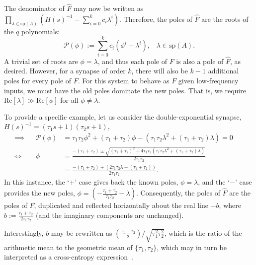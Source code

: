 The denominator of $\hat{F}$ may now be written as $\prod_{\lambda \in \text{sp}(A)} \left( H(s)^{-1} - \sum_{i=0}^k c_i \lambda^i \right)$.
Therefore, the poles of $\hat{F}$ are the roots of the $q$ polynomials:
\begin{equation*}
\mathcal{P}(\phi) := \sum_{i=0}^k c_i \left( \phi^i - \lambda^i \right) \text{,} \quad \lambda \in \text{sp}(A) \text{.}
\end{equation*}
A trivial set of roots are $\phi = \lambda$, and thus each pole of $F$ is also a pole of $\hat{F}$, as desired.
However, for a synapse of order $k$, there will also be $k - 1$ additional poles for every pole of $F$.
For this system to behave as $F$ given low-frequency inputs, we must have the old poles dominate the new poles.
That is, we require $\text{Re} \left[ \lambda \right] \gg \text{Re} \left[ \phi \right]$ for all $\phi \ne \lambda$.

To provide a specific example, let us consider the double-exponential synapse, $H(s)^{-1} = (\tau_1 s + 1)(\tau_2 s + 1)$,
\begin{align*}
\implies && \mathcal{P}(\phi) &= \tau_1 \tau_2 \phi^2 + (\tau_1 + \tau_2) \phi - (\tau_1 \tau_2 \lambda^2 + (\tau_1 + \tau_2) \lambda) = 0 && \\
\iff && \phi &= \frac{-(\tau_1 + \tau_2) \pm \sqrt{(\tau_1 + \tau_2)^2 + 4\tau_1 \tau_2 \left(\tau_1 \tau_2 \lambda^2 + (\tau_1 + \tau_2) \lambda \right)}}{2 \tau_1 \tau_2} && \\
&& &= \frac{-(\tau_1 + \tau_2) \pm \left(2 \tau_1 \tau_2 \lambda + (\tau_1 + \tau_2) \right)}{2 \tau_1 \tau_2} \text{.} &&
\end{align*}
In this instance, the `$+$' case gives back the known poles, $\phi = \lambda$, and the `$-$' case provides the new poles, $\phi = \left(- \frac{\tau_1 + \tau_2}{\tau_1 \tau_2} - \lambda \right)$.
Consequently, the poles of $\hat{F}$ are the poles of $F$, duplicated and reflected horizontally about the real line $- b$, where $b := \frac{\tau_1 + \tau_2}{2 \tau_1 \tau_2}$ (and the imaginary components are unchanged).

Interestingly, $b$ may be rewritten as $\left( \frac{ \tau_1 + \tau_2}{2} \right) / \sqrt{\tau_1^2 \tau_2^2}$, which is the ratio of the arithmetic mean to the geometric mean of $\{\tau_1, \tau_2\}$, which may in turn be interpreted as a cross-entropy expression~\citep{woodhouse2001ratio}.

